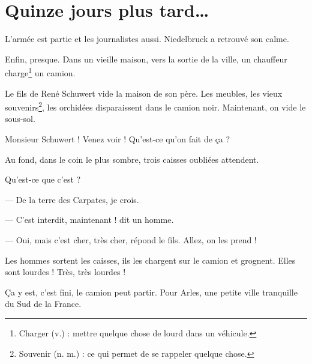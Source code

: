 \chapter{Quinze jours plus tard\ldots{}}
L'armée est partie et les journalistes aussi. Niedelbruck a retrouvé son calme.

Enfin, presque. Dans un vieille maison, vers la sortie de la ville, un chauffeur charge\footnote{Charger (v.) : mettre quelque
chose de lourd dans un véhicule.} un camion.

Le fils de René Schuwert vide la maison de son père. Les meubles, les vieux souvenirs\footnote{Souvenir (n. m.) : ce qui permet
de se rappeler quelque chose.}, les orchidées disparaissent dans le camion noir. Maintenant, on vide le sous-sol.

\og Monsieur Schuwert ! Venez voir ! Qu'est-ce qu'on fait de \c{c}a ? \fg{}

Au fond, dans le coin le plus sombre, trois caisses oubliées attendent.

\og Qu'est-ce que c'est ?

--- De la terre des Carpates, je crois.

--- C'est interdit, maintenant ! dit un homme.

--- Oui, mais c'est cher, très cher, répond le fils. Allez, on les prend ! \fg{}

Les hommes sortent les caisses, ils les chargent sur le camion et grognent. Elles sont lourdes ! Très, très lourdes !

\c{C}a y est, c'est fini, le camion peut partir. Pour Arles, une petite ville tranquille du Sud de la France.
